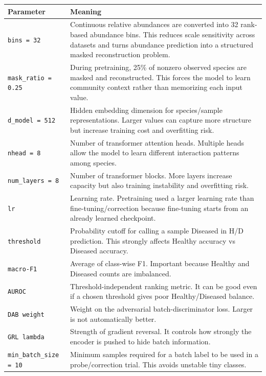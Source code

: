 \documentclass[11pt]{article}
\newcommand{\code}[1]{\texttt{\small #1}}
\begin{document}
\begin{longtable}{p{}p{}}
\toprule
Parameter & Meaning \\
\midrule
\endhead
\code{bins = 32} &
Continuous relative abundances are converted into 32 rank-based abundance bins. This
reduces scale sensitivity across datasets and turns abundance prediction into a structured
masked reconstruction problem. \\
\code{mask\_ratio = 0.25} &
During pretraining, 25\% of nonzero observed species are masked and reconstructed. This
forces the model to learn community context rather than memorizing each input value. \\
\code{d\_model = 512} &
Hidden embedding dimension for species/sample representations. Larger values can capture
more structure but increase training cost and overfitting risk. \\
\code{nhead = 8} &
Number of transformer attention heads. Multiple heads allow the model to learn different
interaction patterns among species. \\
\code{num\_layers = 8} &
Number of transformer blocks. More layers increase capacity but also training instability
and overfitting risk. \\
\code{lr} &
Learning rate. Pretraining used a larger learning rate than fine-tuning/correction because
fine-tuning starts from an already learned checkpoint. \\
\code{threshold} &
Probability cutoff for calling a sample Diseased in H/D prediction. This strongly affects
Healthy accuracy vs Diseased accuracy. \\
\code{macro-F1} &
Average of class-wise F1. Important because Healthy and Diseased counts are imbalanced. \\
\code{AUROC} &
Threshold-independent ranking metric. It can be good even if a chosen threshold gives poor
Healthy/Diseased balance. \\
\code{DAB weight} &
Weight on the adversarial batch-discriminator loss. Larger is not automatically better. \\
\code{GRL lambda} &
Strength of gradient reversal. It controls how strongly the encoder is pushed to hide
batch information. \\
\code{min\_batch\_size = 10} &
Minimum samples required for a batch label to be used in a probe/correction trial. This
avoids unstable tiny classes. \\
\end{longtable}
\end{document}

